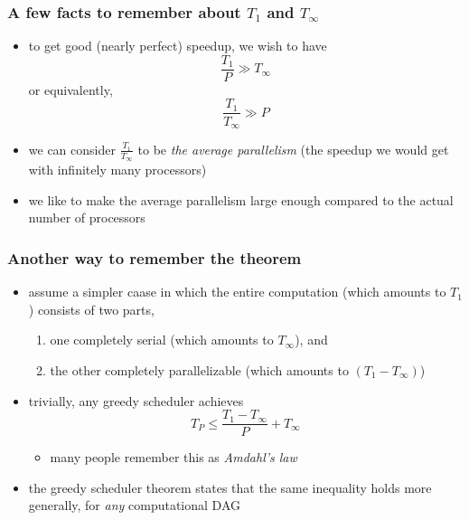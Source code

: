 \documentclass[12pt,dvipdfmx]{beamer}
\begin{document}
\begin{frame}
\frametitle{A few facts to remember about $T_1$ and $T_\infty$}
\begin{itemize}
\item to get good (nearly perfect) speedup, we wish to have
  \[ \frac{T_1}{P} \gg T_\infty \]
  or equivalently, 
  \[ \frac{T_1}{T_\infty} \gg P \]

\item we can consider $\frac{T_1}{T_\infty}$
  to be {\it the average parallelism} (the speedup we would get
  with infinitely many processors)

\item we like to make the average parallelism
  large enough compared to the actual number of processors

\end{itemize}
\end{frame}

\begin{frame}
  \frametitle{Another way to remember the theorem}
  \begin{itemize}
  \item assume a simpler caase
    in which the entire computation (which amounts to $T_1$)
    consists of two parts,
    \begin{enumerate}
    \item one completely serial
      (which amounts to $T_\infty$), and
    \item the other completely parallelizable
      (which amounts to $(T_1 - T_\infty)$)
    \end{enumerate}
  \begin{center}
    \def\svgwidth{0.7\columnwidth}
    {\scriptsize}
  \end{center}
  \item trivially, any greedy scheduler achieves
    \[ T_P \leq \frac{T_1 - T_\infty}{P} + T_\infty \]
    \begin{itemize}
    \item many people remember this as {\it Amdahl's law}
    \end{itemize}
  \item the greedy scheduler theorem states that the same inequality
    holds more generally, for {\it any} computational DAG
  \end{itemize}
\end{frame}
\end{document}
